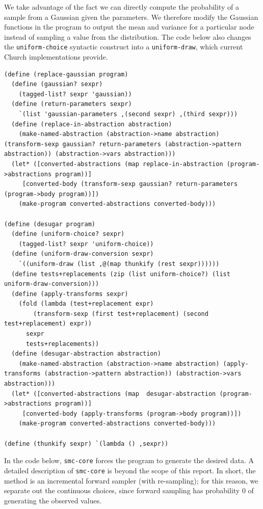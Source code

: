\documentclass[a4paper,10pt]{article}
\begin{document}
We take advantage of the fact we can directly compute the probability of a sample from a Gaussian given the parameters.  We therefore modify the Gaussian functions in the program to output the mean and variance for a particular node instead of sampling a value from the distribution.  The code below also changes the \texttt{uniform-choice} syntactic construct into a \texttt{uniform-draw}, which current Church implementations provide.
\begin{lstlisting}[frame=trbl]
(define (replace-gaussian program)
  (define (gaussian? sexpr)
    (tagged-list? sexpr 'gaussian))
  (define (return-parameters sexpr)
    `(list 'gaussian-parameters ,(second sexpr) ,(third sexpr)))
  (define (replace-in-abstraction abstraction)
    (make-named-abstraction (abstraction->name abstraction) (transform-sexp gaussian? return-parameters (abstraction->pattern abstraction)) (abstraction->vars abstraction)))
  (let* ([converted-abstractions (map replace-in-abstraction (program->abstractions program))]
	 [converted-body (transform-sexp gaussian? return-parameters (program->body program))])
    (make-program converted-abstractions converted-body)))

(define (desugar program)
  (define (uniform-choice? sexpr)
    (tagged-list? sexpr 'uniform-choice))
  (define (uniform-draw-conversion sexpr)
    `((uniform-draw (list ,@(map thunkify (rest sexpr))))))
  (define tests+replacements (zip (list uniform-choice?) (list uniform-draw-conversion)))
  (define (apply-transforms sexpr)
    (fold (lambda (test+replacement expr)
	    (transform-sexp (first test+replacement) (second test+replacement) expr))
	  sexpr
	  tests+replacements))
  (define (desugar-abstraction abstraction)
    (make-named-abstraction (abstraction->name abstraction) (apply-transforms (abstraction->pattern abstraction)) (abstraction->vars abstraction)))
  (let* ([converted-abstractions (map  desugar-abstraction (program->abstractions program))]
	 [converted-body (apply-transforms (program->body program))])
    (make-program converted-abstractions converted-body)))

(define (thunkify sexpr) `(lambda () ,sexpr))
\end{lstlisting}
In the code below, \texttt{smc-core} forces the program to generate the desired data.  A detailed description of \texttt{smc-core} is beyond the scope of this report. In short, the method is an incremental forward sampler (with re-sampling); for this reason, we separate out the continuous choices, since forward sampling has probability $0$ of generating the observed values.
\end{document}
